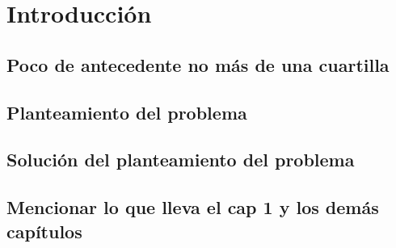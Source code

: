 \chapter{Introducción}
\section{Poco de antecedente no más de una cuartilla}
\section{Planteamiento del problema}
\section{Solución del planteamiento del problema}
\section{Mencionar lo que lleva el cap 1 y los demás capítulos}